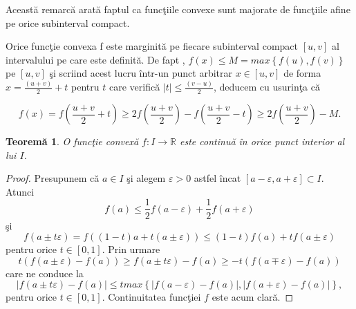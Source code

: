\documentclass[a4paper,12pt,oneside]{report}
\newtheorem{theorem}{Teorem\u a}
\begin{document}
Aceast\u{a} remarc\u{a} arat\u{a} faptul ca func\c{t}iile convexe sunt majorate de func\c{t}iile afine pe orice subinterval compact.

Orice func\c{t}ie convexa f este marginit\u{a} pe fiecare subinterval compact \(\left [ u , v \right ]\) al intervalului pe care este definit\u{a}. De fapt , \(f\left ( x \right ) \leq  M = max \left \{ f\left ( u \right ), f\left ( v \right ) \right \}\)  pe \(\left [ u , v \right ]\)  \c{s}i scriind acest lucru \^{i}ntr-un punct arbitrar \(x\in  \left [ u , v  \right ]\)  de forma  \(x= \frac{\left ( u + v \right )}{2} + t\) pentru  \(t\) care verific\u{a} \(\left | t \right |\leq \frac{\left ( v - u \right )}{2}\), deducem cu usurin\c{t}a c\u{a}

\begin{displaymath}
  f\left ( x \right )=  f\left ( \frac{u+v}{2} + t\right )\geq 2 f\left ( \frac{u + v}{2} \right )- f\left ( \frac{u + v}{2} - t\right )\geq 2f\left ( \frac{u+v}{2} \right ) - M.
\end{displaymath}

\begin{theorem}
O func\c{t}ie convex\u{a} \(f: I \rightarrow \mathbb{R}\) este continu\u{a} \^{i}n orice punct interior al lui \(I\). 	
\end{theorem}
\begin{proof}
	Presupunem c\u{a} \(a\in I\) \c{s}i alegem \(\varepsilon > 0\) astfel \^{i}ncat \(\left [ a - \varepsilon , a + \varepsilon  \right ] \subset I\).
 Atunci
\begin{displaymath}
  f\left ( a \right )\leq \frac{1}{2} f\left ( a - \varepsilon  \right ) + \frac{1}{2}f \left ( a + \varepsilon  \right )
\end{displaymath}
\c{s}i
\begin{displaymath}
  f\left ( a \pm t\varepsilon  \right )= f\left ( \left ( 1 - t \right ) a + t\left ( a \pm \varepsilon  \right )\right )\leq \left ( 1 - t \right )f\left ( a \right ) + tf\left ( a\pm \varepsilon  \right )
\end{displaymath}
pentru orice \(t\in \left [ 0 , 1 \right ]\). Prin urmare
\begin{displaymath}
  t\left ( f\left ( a\pm \varepsilon  \right ) - f\left ( a \right ) \right )\geq f\left ( a\pm t\varepsilon  \right )- f\left ( a \right )\geq -t\left ( f\left ( a\mp \varepsilon  \right ) - f\left ( a \right )\right )
\end{displaymath}
care ne conduce la
\begin{displaymath}
\left | f\left ( a\pm t\varepsilon  \right )- f\left ( a \right ) \right |\leq t max \left \{ \left | f\left ( a-\varepsilon  \right )- f\left ( a \right ) \right |, \left | f\left ( a+\varepsilon  \right ) - f\left ( a \right )\right | \right \},
\end{displaymath}
 pentru orice \(t\in \left [ 0 , 1 \right ]\). Continuitatea func\c{t}iei \(f\) este acum clar\u{a}.
 \end{proof}
\end{document}
